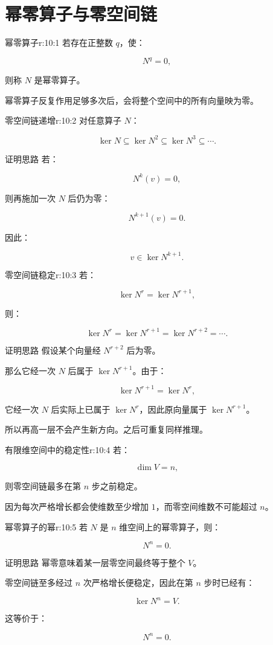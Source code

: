 
\chapter{幂零算子与零空间链}


\begin{jdefn}{幂零算子}{r:10:1}
若存在正整数 $q$，使：

\[
N^q=0,
\]

则称 $N$ 是幂零算子。

幂零算子反复作用足够多次后，会将整个空间中的所有向量映为零。
\end{jdefn}

\begin{jprop}{零空间链递增}{r:10:2}
对任意算子 $N$：

\[
\ker N
\subseteq
\ker N^2
\subseteq
\ker N^3
\subseteq\cdots.
\]
\end{jprop}

\begin{jproof}{证明思路}
若：

\[
N^k(v)=0,
\]

则再施加一次 $N$ 后仍为零：

\[
N^{k+1}(v)=0.
\]

因此：

\[
v\in\ker N^{k+1}.
\]
\end{jproof}

\begin{jprop}{零空间链稳定}{r:10:3}
若：

\[
\ker N^r=\ker N^{r+1},
\]

则：

\[
\ker N^r=\ker N^{r+1}=\ker N^{r+2}=\cdots.
\]
\end{jprop}

\begin{jproof}{证明思路}
假设某个向量经 $N^{r+2}$ 后为零。

那么它经一次 $N$ 后属于 $\ker N^{r+1}$。由于：

\[
\ker N^{r+1}=\ker N^r,
\]

它经一次 $N$ 后实际上已属于 $\ker N^r$，因此原向量属于 $\ker N^{r+1}$。

所以再高一层不会产生新方向。之后可重复同样推理。
\end{jproof}

\begin{jprop}{有限维空间中的稳定性}{r:10:4}
若：

\[
\dim V=n,
\]

则零空间链最多在第 $n$ 步之前稳定。

因为每次严格增长都会使维数至少增加 $1$，而零空间维数不可能超过 $n$。
\end{jprop}

\begin{jprop}{幂零算子的幂}{r:10:5}
若 $N$ 是 $n$ 维空间上的幂零算子，则：

\[
N^n=0.
\]
\end{jprop}

\begin{jproof}{证明思路}
幂零意味着某一层零空间最终等于整个 $V$。

零空间链至多经过 $n$ 次严格增长便稳定，因此在第 $n$ 步时已经有：

\[
\ker N^n=V.
\]

这等价于：

\[
N^n=0.
\]
\end{jproof}
